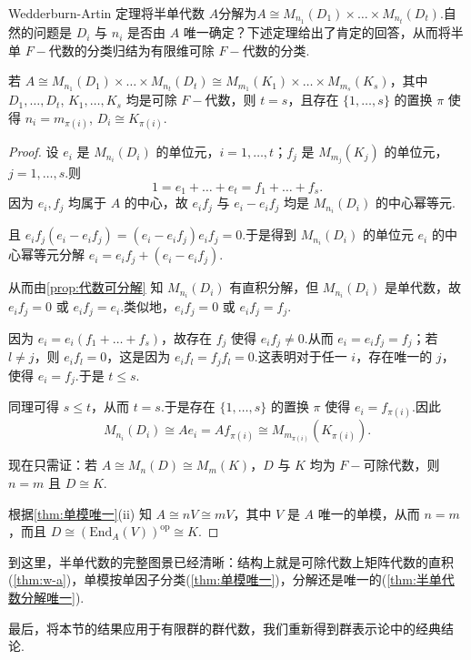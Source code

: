 Wedderburn-Artin 定理将半单代数 $A$分解为$A \cong M_{n_1}(D_1) \times \dots \times M_{n_t}(D_t)$.自然的问题是 $D_i$ 与 $n_i$ 是否由 $A$ 唯一确定？下述定理给出了肯定的回答，从而将半单 $F-\!\!$代数的分类归结为有限维可除 $F-\!\!$代数的分类.

\begin{theorem}
若 $A \cong M_{n_1}(D_1) \times \dots \times M_{n_t}(D_t) \cong M_{m_1}(K_1) \times \dots \times M_{m_s}(K_s)$，其中 $D_1, \dots, D_t$, $K_1, \dots, K_s$ 均是可除 $F-\!\!$代数，则 $t = s$，且存在 $\{1, \dots, s\}$ 的置换 $\pi$ 使得 $n_i = m_{\pi(i)}$, $D_i \cong K_{\pi(i)}$.
\end{theorem}
\begin{proof}
设 $e_i$ 是 $M_{n_i}(D_i)$ 的单位元，$i = 1, \dots, t$；$f_j$ 是 $M_{m_j}(K_j)$ 的单位元，$j = 1, \dots, s$.则
$$
1 = e_1 + \dots + e_t = f_1 + \dots + f_s.
$$
因为 $e_i, f_j$ 均属于 $A$ 的中心，故 $e_i f_j$ 与 $e_i - e_i f_j$ 均是 $M_{n_i}(D_i)$ 的中心幂等元.\par
且 $e_i f_j (e_i - e_i f_j) = (e_i - e_i f_j) e_i f_j = 0$.于是得到 $M_{n_i}(D_i)$ 的单位元 $e_i$ 的中心幂等元分解 $e_i = e_i f_j + (e_i - e_i f_j)$.\par
从而由\cref{prop:代数可分解} 知 $M_{n_i}(D_i)$ 有直积分解，但 $M_{n_i}(D_i)$ 是单代数，故 $e_i f_j = 0$ 或 $e_i f_j = e_i$.类似地，$e_i f_j = 0$ 或 $e_i f_j = f_j$.\par
因为 $e_i = e_i(f_1 + \dots + f_s)$，故存在 $f_j$ 使得 $e_i f_j \neq 0$.从而 $e_i = e_i f_j = f_j$；若 $l \neq j$，则 $e_i f_l = 0$，这是因为 $e_i f_l = f_j f_l = 0$.这表明对于任一 $i$，存在唯一的 $j$，使得 $e_i = f_j$.于是 $t \leq s$.

同理可得 $s \leq t$，从而 $t = s$.于是存在 $\{1, \dots, s\}$ 的置换 $\pi$ 使得 $e_i = f_{\pi(i)}$.因此
\[
M_{n_i}(D_i) \cong A e_i = A f_{\pi(i)} \cong M_{m_{\pi(i)}}(K_{\pi(i)}).
\]

现在只需证：若 $A \cong M_n(D) \cong M_m(K)$，$D$ 与 $K$ 均为 $F-\!\!$可除代数，则 $n = m$ 且 $D \cong K$.

根据\cref{thm:单模唯一}(ii) 知 $A \cong nV \cong mV$，其中 $V$ 是 $A$ 唯一的单模，从而 $n = m$，而且 $D \cong (\mathrm{End}_A(V))^{\mathrm{op}} \cong K$.
\end{proof}

到这里，半单代数的完整图景已经清晰：结构上就是可除代数上矩阵代数的直积(\cref{thm:w-a})，单模按单因子分类(\cref{thm:单模唯一})，分解还是唯一的(\cref{thm:半单代数分解唯一}).

最后，将本节的结果应用于有限群的群代数，我们重新得到群表示论中的经典结论.

